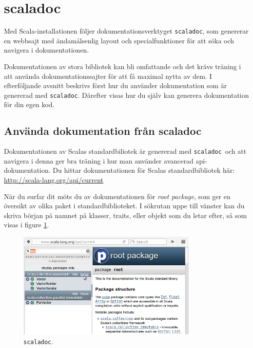 \section{scaladoc}
\newcommand{\scaladoc}{\texttt{scaladoc}}

Med Scala-installationen följer dokumentationsverktyget \scaladoc, som genererar en webbsajt med ändamålsenlig layout och specialfunktioner för att söka och navigera i dokumentationen. 

Dokumentationen av stora bibliotek kan bli omfattande och det krävs träning i att använda dokumentationssajter för att få maximal nytta av dem. I efterföljande avsnitt beskrivs först hur du använder dokumentation som är genererad med \scaladoc. Därefter visas hur du själv kan generera dokumentation för din egen kod.


\subsection{Använda dokumentation från scaladoc}

Dokumentationen av Scalas standardbiliotek är genererad med \scaladoc~och att navigera i denna ger bra träning i hur man använder avancerad api-dokumentation. Du hittar dokumentationen för Scalas standardbibliotek här: \\
\url{http://scala-lang.org/api/current} 


När du surfar dit möts du av dokumentationen för \textit{root package}, som ger en översikt av olika paket i standardbiblioteket. I sökrutan uppe till vänster kan du skriva början på namnet på klasser, traits, eller objekt som du letar efter, så som visas i figure \ref{fig:scaladoc:root-package}.

\begin{figure}[H]
\centering
\includegraphics[width=0.8\textwidth]{../img/scaladoc/scaladoc-root}

     \caption{ \scaladoc.}
    \label{fig:scaladoc:root-package}
\end{figure}

